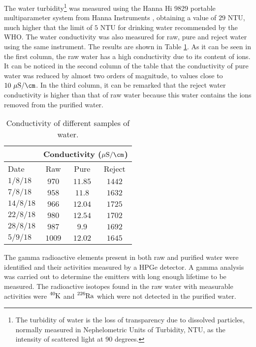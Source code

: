 The water turbidity\footnote{The turbidity of water is the loss of transparency due to dissolved particles, normally measured in Nephelometric Units of Turbidity, NTU, as the intensity of scattered light at 90 degrees.} was measured using the Hanna Hi 9829 portable multiparameter system from Hanna Instruments \cite{TurbiditySystem}, obtaining a value of $29$ NTU, much higher that the limit of $5$ NTU for drinking water recommended by the WHO. The water conductivity was also measured for raw, pure and reject water using the same instrument. The results are shown in Table \ref{tab:ConductivityValues}. As it can be seen in the first column, the raw water has a high conductivity due to its content of ions. It can be noticed in the second column of the table that the conductivity of pure water was reduced by almost two orders of magnitude, to values close to $10~\mu\text{S}/\cm$. In the third column, it can be remarked that the reject water conductivity is higher than that of raw water because this water contains the ions removed from the purified water.


\begin{table}[htbp]
\centering{}%
\begin{tabular}{lccc}
\toprule 
& \multicolumn{3}{c}{Conductivity ($\mu\text{S}/\cm$)} \tabularnewline
\midrule
Date & Raw & Pure & Reject \tabularnewline
\midrule
\midrule 
$1/8/18$ & $970$ & $11.85$ & $1442$ \tabularnewline
$7/8/18$ & $958$ & $11.8$ & $1632$ \tabularnewline
$14/8/18$ & $966$ & $12.04$ & $1725$ \tabularnewline
$22/8/18$ & $980$ & $12.54$ & $1702$ \tabularnewline
$28/8/18$ & $987$ & $9.9$ & $1692$ \tabularnewline
$5/9/18$ & $1009$ & $12.02$ & $1645$ \tabularnewline
\bottomrule
\end{tabular}
\caption{Conductivity of different samples of water.}
\label{tab:ConductivityValues}
\end{table}

The gamma radioactive elements present in both raw and purified water were identified and their activities measured by a HPGe detector. A gamma analysis was carried out to determine the emitters with long enough lifetime to be measured. The radioactive isotopes found in the raw water with measurable activities were $\ce{^{40}K}$ and $\ce{^{226}Ra}$ which were not detected in the purified water.


